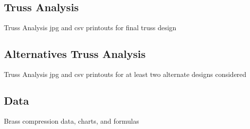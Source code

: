 \documentclass{article}
\let\Oldsubsection\subsection
\renewcommand{\subsection}{\FloatBarrier\Oldsubsection}
\begin{document}
\begin{sidewaysfigure}
\begin{ganttchart}{1}{30}
\\
\\
 \\
 \\
 \\
\\
 \\
 \\
 \\
\\
\end{ganttchart}
\end{sidewaysfigure}

\newpage

\subsection{Truss Analysis}

Truss Analysis jpg and csv printouts for final truss design

\newpage

\subsection{Alternatives Truss Analysis}

Truss Analysis jpg and csv printouts for at least two alternate designs considered

\newpage

\subsection{Data}

Brass compression data, charts, and formulas

\newpage

\printbibliography
\end{document}
